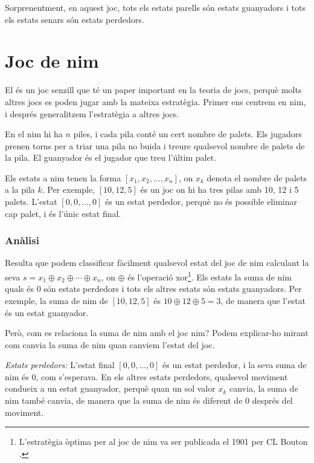 Sorprenentment, en aquest joc, tots els estats parells són estats
guanyadors i tots els estats senars són estats perdedors.

\section{Joc de nim}


El  és un joc senzill que té un paper important en la
teoria de jocs, perquè molts altres jocs es poden jugar amb la mateixa
estratègia. Primer ens centrem en nim, i després generalitzem
l'estratègia a altres jocs.

En el nim hi ha $n$ piles, i cada pila conté un cert nombre de
palets. Els jugadors prenen torns per a triar una pila no buida i
treure qualsevol nombre de palets de la pila. El guanyador és el
jugador que treu l'últim palet.

Els estats a nim tenen la forma $[x_1,x_2,\ldots,x_n]$, on $x_k$
denota el nombre de palets a la pila $k$. Per exemple, $[10,12,5]$ és
un joc on hi ha tres pilas amb 10, 12 i 5 palets. L'estat
$[0,0,\ldots,0]$ és un estat perdedor, perquè no és possible eliminar
cap palet, i és l'únic estat final.

\subsubsection{Anàlisi} 

Resulta que podem classificar fàcilment qualsevol estat del joc de nim
calculant la seva  $s = x_1 \oplus x_2 \oplus \cdots
\oplus x_n$, on $\oplus$ és l'operació xor\footnote{L'estratègia
òptima per al joc de nim va ser publicada el 1901 per CL Bouton
\cite{bou01}.}. Els estats la suma de nim quals és 0 són estats
perdedors i tots els altres estats són estats guanyadors. Per exemple,
la suma de nim de $[10,12,5]$ és $10 \oplus 12 \oplus 5 = 3$, de
manera que l'estat és un estat guanyador.

Però, com es relaciona la suma de nim amb el joc nim? Podem
explicar-ho mirant com canvia la suma de nim quan canviem l'estat del joc.

\textit{Estats perdedors:} L'estat final $[0,0,\ldots,0]$ és un estat
perdedor, i la seva suma de nim és 0, com s'esperava. En els altres estats
perdedors, qualsevol moviment condueix a un estat guanyador, perquè
quan un sol valor $x_k$ canvia, la suma de nim també canvia, de manera
que la suma de nim és diferent de 0 després del moviment.

